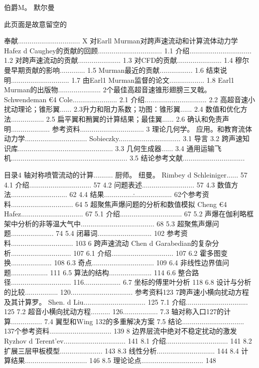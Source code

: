 \documentclass[UTF8,11pt,a4paper,openany,fontset=fandol]{ctexbook}
\begin{document}
伯爵M。 默尔曼

此页面是故意留空的

奉献................................ X 对Earll Murman对跨声速流动和计算流体动力学 Hafez d Caughey的贡献的回顾................................. 1.1 介绍................................ 1.2 对跨声速流动的贡献...................... 1.3 对CFD的贡献....................... 1.4 穆尔曼早期贡献的影响............. 1.5 Murman最近的贡献................. 1.6 结束说明.............................. 1.7 由Earl1 Murman监督的论文.................. 1.8 Earl1 Murman的出版物...................... 2个最佳高超音速锥形翅膀三叉戟。 Schwendeman €4 Cole....................... 2.1 介绍................................ 2.2 高超音速小扰动理论；锥形翼...... 2.3升力和阻力系数；功图：锥形翼...... 2.4 数值和优化方法................. 2.5 扁平翼和矟翼的计算结果；最佳翼...... 2.6 确认和免责声明.................... 参考资料................................. 3 理论几何学。 应用。和教育流体动力学................................ Sobieczky................................ 3.1 导言 3.2 跨声速知识库................................................. 3.3 几何生成器...... 3.4 通用运输飞机............................................................ 3.5 结论参考文献................................

目录4 轴对称喷管流动的计算.......... 厨师。 纽曼。 Rimbey d Schleiniger...... 57 4.1 介绍................................ 57 4.2 问题表述........................... 57 4.3 数值方法............................. 62 4.4 结果...............:................... 62个参考资料................................ 64 5 超聚焦声爆问题的分析和数值模拟 Cheng €4 Hafez................................ 67 5.1 介绍................................ 67 5.2 声爆在伽利略框架中分析的非等温大气中...................................... 68 5.3 超聚焦声爆问题...................... 74 5.4 闭幕词............................ 102 参考资料................................ 103 6 跨声速流动 Chen d Garabedian的复杂分析............................... 107 6.1 介绍................................ 107 6.2 霍多图变换..................... 108 6.3 奇点................................ 109 6.4 非线性边界值问题................... 111 6.5 算法的结构...................... 114 6.6 整合路径............................... 116................... 6.7 坐标的傅里叶分析 118 6.8 设计与分析的比较................. 120................................ 参考资料123 7跨声速小横向扰动方程及其计算罗。 Shen. d Liu................................ 125 7.1 介绍................................ 125 7.2 超音小横向扰动方程.......... 126.................. 7.3 轴对称入口127的计算................ 7.4 翼型和Wing 132的多重解决方案 7.5 结论................................ 137个参考资料................................ 139 8 边界层流中绝对不稳定扰动的激发 Ryzhov d Terent'ev................................ 141 8.1 介绍................................ 141 8.2 扩展三层甲板模型...................... 143 8.3 线性分析.............................. 144 8.4 计算结果................................ 146 8.5 理论论点................................ 148
\end{document}
